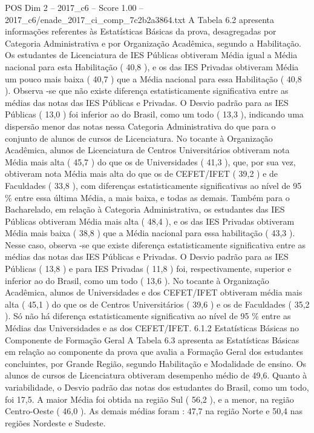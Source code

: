 \begin{textsample}{POS Dim 2 – 2017\_c6 – Score 1.00 – 2017\_c6/enade\_2017\_ci\_comp\_7c2b2a3864.txt}
A Tabela 6.2 apresenta informações referentes às Estatísticas Básicas da prova, desagregadas por Categoria Administrativa e por Organização Acadêmica, segundo a Habilitação.
Os estudantes de Licenciatura de IES Públicas obtiveram Média igual a Média nacional para esta Habilitação ( 40,8 ), e os das IES Privadas obtiveram Média um pouco mais baixa ( 40,7 ) que a Média nacional para essa Habilitação ( 40,8 ).
Observa -se que não existe diferença estatisticamente significativa entre as médias das notas das IES Públicas e Privadas.
O Desvio padrão para as IES Públicas ( 13,0 ) foi inferior ao do Brasil, como um todo ( 13,3 ), indicando uma dispersão menor das notas nessa Categoria Administrativa do que para o conjunto de alunos de cursos de Licenciatura.
No tocante à Organização Acadêmica, alunos de Licenciatura de Centros Universitários obtiveram nota Média mais alta ( 45,7 ) do que os de Universidades ( 41,3 ), que, por sua vez, obtiveram nota Média mais alta do que os de CEFET/IFET ( 39,2 ) e de Faculdades ( 33,8 ), com diferenças estatisticamente significativas ao nível de 95 \% entre essa última Média, a mais baixa, e todas as demais.
Também para o Bacharelado, em relação à Categoria Administrativa, os estudantes das IES Públicas obtiveram Média mais alta ( 48,4 ), e os das IES Privadas obtiveram Média mais baixa ( 38,8 ) que a Média nacional para essa habilitação ( 43,3 ).
Nesse caso, observa -se que existe diferença estatisticamente significativa entre as médias das notas das IES Públicas e Privadas.
O Desvio padrão para as IES Públicas ( 13,8 ) e para IES Privadas ( 11,8 ) foi, respectivamente, superior e inferior ao do Brasil, como um todo ( 13,6 ).
No tocante à Organização Acadêmica, alunos de Universidades e dos CEFET/IFET obtiveram média mais alta ( 45,1 ) do que os de Centros Universitários ( 39,6 ) e os de Faculdades ( 35,2 ).
Só não há diferença estatisticamente significativa ao nível de 95 \% entre as Médias das Universidades e as dos CEFET/IFET. 6.1.2 Estatísticas Básicas no Componente de Formação Geral A Tabela 6.3 apresenta as Estatísticas Básicas em relação ao componente da prova que avalia a Formação Geral dos estudantes concluintes, por Grande Região, segundo Habilitação e Modalidade de ensino.
Os alunos de cursos de Licenciatura obtiveram desempenho médio de 49,6.
Quanto à variabilidade, o Desvio padrão das notas dos estudantes do Brasil, como um todo, foi 17,5.
A maior Média foi obtida na região Sul ( 56,2 ), e a menor, na região Centro-Oeste ( 46,0 ).
As demais médias foram : 47,7 na região Norte e 50,4 nas regiões Nordeste e Sudeste.

\end{textsample}
